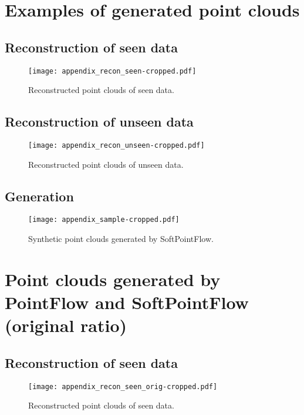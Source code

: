 \documentclass{article}
\begin{document}
\newpage

\section{Examples of generated point clouds}
\label{appendix:b}
\subsection{Reconstruction of seen data}
\begin{figure}[h]
	\centering
	\texttt{[image: appendix\_recon\_seen-cropped.pdf]}
    \caption{Reconstructed point clouds of seen data.}
	\label{fig:appendix_fig_1}
\end{figure}

\newpage
\subsection{Reconstruction of unseen data}
\begin{figure}[h]
	\centering
	\texttt{[image: appendix\_recon\_unseen-cropped.pdf]}
    \caption{Reconstructed point clouds of unseen data.}
	\label{fig:appendix_fig_2}
\end{figure}

\newpage
\subsection{Generation}
\begin{figure}[h]
	\centering
	\texttt{[image: appendix\_sample-cropped.pdf]}
    \caption{Synthetic point clouds generated by SoftPointFlow.}
	\label{fig:appendix_fig_3}
\end{figure}

\newpage

\section{Point clouds generated by PointFlow and SoftPointFlow (original ratio)}
\label{appendix:c}
\subsection{Reconstruction of seen data}
\begin{figure}[h]
	\centering
	\texttt{[image: appendix\_recon\_seen\_orig-cropped.pdf]}
    \caption{Reconstructed point clouds of seen data.}
	\label{fig:appendix_fig_4}
\end{figure}
\end{document}
